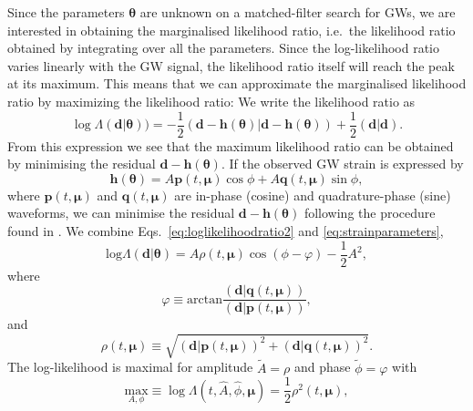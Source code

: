 \documentclass[a4paper,12pt]{article}
\begin{document}
Since the parameters $\boldsymbol{\theta}$ are unknown on a matched-filter search for GWs, we are interested in obtaining the marginalised likelihood ratio, i.e.\ the likelihood ratio obtained by integrating over all the parameters. 
Since the log-likelihood ratio varies linearly with the GW signal, the likelihood ratio itself will reach the peak at its maximum. This means that we can approximate the marginalised likelihood ratio by maximizing the likelihood ratio: We write the likelihood ratio as 
\begin{equation}    
\log\Lambda(\mathbf{d}|\boldsymbol{\theta})) = -\frac{1}{2}(\mathbf{d}-\mathbf{h}(\boldsymbol{\theta})|\mathbf{d}-\mathbf{h}(\boldsymbol{\theta}))+\frac{1}{2}(\mathbf{d}|\mathbf{d}).
\label{eq:loglikelihoodratio2}
\end{equation}
From this expression we see that the maximum likelihood ratio can be obtained by minimising the residual $\mathbf{d}-\mathbf{h}(\boldsymbol{\theta})$. If the observed GW strain is expressed by
\begin{equation}    
\mathbf{h}(\boldsymbol{\theta}) = A \mathbf{p}(t,\boldsymbol{\mu}) \cos\phi + A \mathbf{q}(t,\boldsymbol{\mu}) \sin\phi,
\label{eq:strainparameters}
\end{equation}
where $\mathbf{p}(t,\boldsymbol{\mu})$ and $\mathbf{q}(t,\boldsymbol{\mu})$ are in-phase (cosine) and quadrature-phase (sine) waveforms, we can minimise the residual $\mathbf{d}-\mathbf{h}(\boldsymbol{\theta})$ following the procedure found in \cite{abbott2020guide}. 
We combine Eqs.~\eqref{eq:loglikelihoodratio2} and \eqref{eq:strainparameters},
\begin{equation}    
\mathrm{log}\Lambda(\mathbf{d}|\boldsymbol{\theta}) = A \rho (t,\boldsymbol{\mu}) \cos (\phi - \varphi) - \frac{1}{2}A^{2},
\label{eq:loglikelihoodratio3}
\end{equation}
where
\begin{equation}    
\varphi \equiv \mathrm{arctan}\frac{(\mathbf{d}|\mathbf{q}(t,\boldsymbol{\mu}))}{(\mathbf{d}|\mathbf{p}(t,\boldsymbol{\mu}))},
\label{eq:varphi}
\end{equation}
and
\begin{equation}    
\rho (t,\boldsymbol{\mu}) \equiv \sqrt{(\mathbf{d}|\mathbf{p}(t,\boldsymbol{\mu}))^{2}+(\mathbf{d}|\mathbf{q}(t,\boldsymbol{\mu}))^{2}}.
\label{eq:SNRtimeseries}
\end{equation}
The log-likelihood is maximal for amplitude $\tilde{A}=\rho$ and phase $\tilde{\phi} = \varphi$ with
\begin{equation}    
\underset{A,\phi}{\mathrm{max}} \equiv \log\Lambda(t,\hat{A},\hat{\phi},\boldsymbol{\mu}) = \frac{1}{2} \rho^{2}(t,\boldsymbol{\mu}),
\label{eq:maxloglikelihood}
\end{equation}
\end{document}

